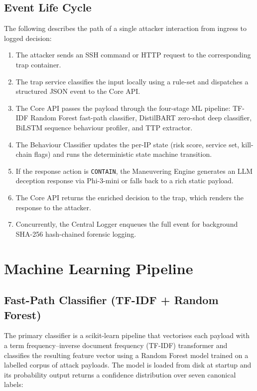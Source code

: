 \subsection{Event Life Cycle}

The following describes the path of a single attacker interaction from ingress to logged decision:

\begin{enumerate}
    \item The attacker sends an \ac{SSH} command or \ac{HTTP} request to the corresponding trap container.
    \item The trap service classifies the input locally using a rule-set and dispatches a structured JSON event to the Core API.
    \item The Core API passes the payload through the four-stage ML pipeline: TF-IDF Random Forest fast-path classifier, DistilBART zero-shot deep classifier, BiLSTM sequence behaviour profiler, and TTP extractor.
    \item The Behaviour Classifier updates the per-IP state (risk score, service set, kill-chain flags) and runs the deterministic state machine transition.
    \item If the response action is \texttt{CONTAIN}, the Maneuvering Engine generates an LLM deception response via Phi-3-mini or falls back to a rich static payload.
    \item The Core API returns the enriched decision to the trap, which renders the response to the attacker.
    \item Concurrently, the Central Logger enqueues the full event for background SHA-256 hash-chained forensic logging.
\end{enumerate}

\section{Machine Learning Pipeline}

\subsection{Fast-Path Classifier (TF-IDF + Random Forest)}

The primary classifier is a scikit-learn pipeline that vectorises each payload with a term frequency–inverse document frequency (TF-IDF) transformer and classifies the resulting feature vector using a Random Forest model trained on a labelled corpus of attack payloads. The model is loaded from disk at startup and its probability output returns a confidence distribution over seven canonical labels:

